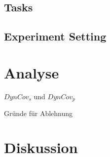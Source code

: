 \documentclass[xcolor=dvipsnames]{beamer}
\begin{document}
\subsection{Tasks}
\subsection{Experiment Setting}

\section{Analyse}
\begin{frame}{\(DynCov_s\) und \(DynCov_p\)}
    \begin{figure}[!h]
        
    \end{figure}
\end{frame}
\begin{frame}{Gründe für Ablehnung}
    \begin{figure}[!h]
        
     \end{figure}
\end{frame}

\section{Diskussion}
\end{document}

